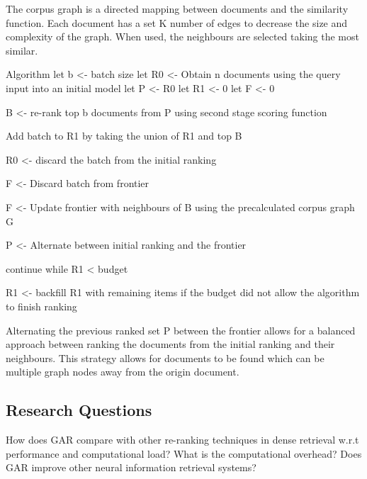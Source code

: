 \documentclass[sigconf,authorversion,nonacm]{acmart}
\begin{document}
The corpus graph is a directed mapping between documents and the similarity function. Each document
has a set K number of edges to decrease the size and complexity of the graph. When used, the
neighbours are selected taking the most similar.

Algorithm
let b <- batch size
let R0 <- Obtain n documents using the query input into an initial model
let P <- R0
let R1 <- 0
let F <- 0

B <- re-rank top b documents from P using second stage scoring function

Add batch to R1 by taking the union of R1 and top B

R0 <- discard the batch from the initial ranking

F <- Discard batch from frontier

F <- Update frontier with neighbours of B using the precalculated corpus graph G

P <- Alternate between initial ranking and the frontier

continue while R1 < budget

R1 <- backfill R1 with remaining items if the budget did not allow the algorithm to finish ranking

Alternating the previous ranked set P between the frontier allows for a balanced approach between
ranking the documents from the initial ranking and their neighbours. This strategy allows for
documents to be found which can be multiple graph nodes away from the origin document.
\subsection{Research Questions}

How does GAR compare with other re-ranking techniques in dense retrieval w.r.t performance and
computational load?
What is the computational overhead?
Does GAR improve other neural information retrieval systems?


\end{document}
